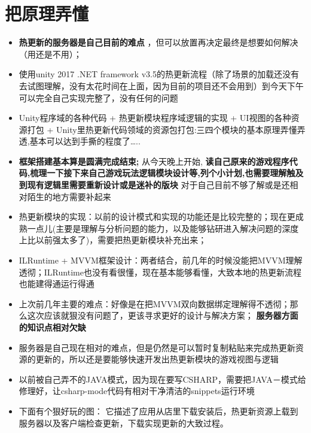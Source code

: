 \documentclass[9pt, b5paper]{article}
\begin{document}
\section{把原理弄懂}
\label{sec-5}
\begin{itemize}
\item \textbf{热更新的服务器是自己目前的难点} ，但可以放置再决定最终是想要如何解决（用还是不用）；
\item 使用unity 2017 .NET framework v3.5的热更新流程（除了场景的加载还没有去试图理解，没有太花时间在上面，因为目前的项目还不会用到）到今天下午可以完全自己实现完整了，没有任何的问题
\item Unity程序域的各种代码 + 热更新模块程序域逻辑的实现 + UI视图的各种资源打包 + Unity里热更新代码领域的资源包打包:三四个模块的基本原理弄懂弄透,基本可以达到手撕的程度了\ldots{}..
\item \textbf{框架搭建基本算是圆满完成结束;} 从今天晚上开始, \textbf{读自己原来的游戏程序代码,梳理一下接下来自己游戏玩法逻辑模块设计等,列个小计划,也需要理解触及到现有逻辑里需要重新设计或是迷补的版块} 对于自己目前不够了解或是还相对陌生的地方需要补起来
\item 热更新模块的实现：以前的设计模式和实现的功能还是比较完整的；现在更成熟一点儿(主要是理解与分析问题的能力，以及能够钻研进入解决问题的深度上比以前强太多了)，需要把热更新模块补充出来；
\item ILRuntime + MVVM框架设计：两者结合，前几年的时候没能把MVVM理解透彻；ILRuntime也没有看很懂，现在基本能够看懂，大致本地的热更新流程也能建得通运行得通
\item 上次前几年主要的难点：好像是在把MVVM双向数据绑定理解得不透彻；那么这次应该就狠没有问题了，更该寻求更好的设计与解决方案； \textbf{服务器方面的知识点相对欠缺}
\item 服务器是自己现在相对的难点，但是仍然是可以暂时复制粘贴来完成热更新资源的更新的，所以还是要能够快速开发出热更新模块的游戏视图与逻辑
\item 以前被自己弄不的JAVA模式，因为现在要写CSHARP，需要把JAVA－模式给修理好，让csharp-mode代码有相对干净清洁的snippets运行环境
\item 下面有个狠好玩的图： 它描述了应用从店里下载安装后，热更新资源上载到服务器以及客户端检查更新，下载实现更新的大致过程。
\end{itemize}
\end{document}
